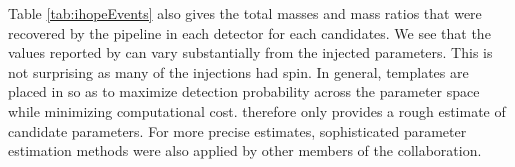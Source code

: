 Table \ref{tab:ihopeEvents} also gives the total masses and mass ratios that 
were recovered by the \ihope{} pipeline in each detector for each candidates. 
We see that the values reported by \ihope{} can vary substantially
from the injected parameters. This is not surprising as many of the injections
had spin.
In general, templates are
placed in \ihope{} so as to maximize detection probability across the parameter
space while minimizing computational cost. \ihope{} therefore only provides a
rough estimate of candidate parameters. For more precise estimates, 
sophisticated parameter estimation methods were also applied by other members
of the collaboration.


